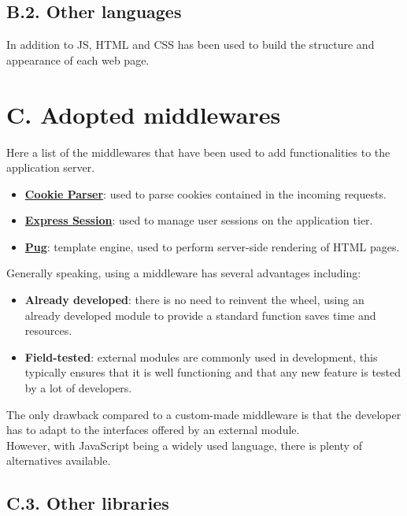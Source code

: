 \subsection{B.2. Other languages}

In addition to JS, HTML and CSS has been used to build the structure and appearance of each web page.

\section{C. Adopted middlewares}

Here a list of the middlewares that have been used to add functionalities to the application server.
\begin{itemize}
  \item \textbf{\href{https://www.npmjs.com/package/cookie-parser}{Cookie Parser}}: used to parse cookies contained in the incoming requests.
  \item \textbf{\href{https://www.npmjs.com/package/express-session}{Express Session}}: used to manage user sessions on the application tier.
  \item \textbf{\href{https://www.npmjs.com/package/pug}{Pug}}: template engine, used to perform server-side rendering of HTML pages.
\end{itemize}

Generally speaking, using a middleware has several advantages including:
\begin{itemize}
  \item \textbf{Already developed}: there is no need to reinvent the wheel, using an already developed module to provide a standard function saves time and resources.
  \item \textbf{Field-tested}: external modules are commonly used in development, this typically ensures that it is well functioning and that any new feature is tested by a lot of developers.
\end{itemize}
The only drawback compared to a custom-made middleware is that the developer has to adapt to the interfaces offered by an external module.\\
However, with JavaScript being a widely used language, there is plenty of alternatives available.

\clearpage
\subsection{C.3. Other libraries}

